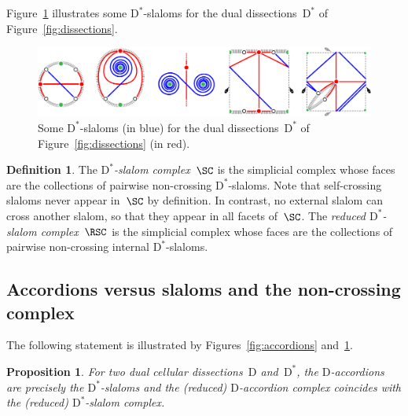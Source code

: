 \documentclass{amsart}
\newtheorem{proposition}[theorem]{Proposition}
\theoremstyle{definition}
\newtheorem{definition}[theorem]{Definition}
\newtheorem{remark}[theorem]{Remark}
\newcommand{\fref}[1]{Figure~\ref{#1}} %
\newcommand{\darkblue}{\color{darkblue}} %
\newcommand{\defn}[1]{\textsl{\darkblue #1}} %
\newcommand{\dual}{^*} %
\newcommand{\dissection}{\mathrm{D}} %
\begin{document}
\fref{fig:slaloms} illustrates some $\dissection\dual$-slaloms for the dual dissections~$\dissection\dual$ of \fref{fig:dissections}.

\begin{figure}[t]
	\capstart
	\centerline{\includegraphics[scale=.7]{slaloms}}
	\caption{Some $\dissection\dual$-slaloms (in blue) for the dual dissections~$\dissection\dual$ of \fref{fig:dissections} (in red).}
	\label{fig:slaloms}
\end{figure}

\begin{definition}
\label{def:slalomComplex}
The \defn{$\dissection\dual$-slalom complex}~$\SC$ is the simplicial complex whose faces are the collections of pairwise non-crossing $\dissection\dual$-slaloms.
Note that self-crossing slaloms never appear in~$\SC$ by definition.
In contrast, no external slalom can cross another slalom, so that they appear in all facets of~$\SC$. 
The \defn{reduced $\dissection\dual$-slalom complex}~$\RSC$ is the simplicial complex whose faces are the collections of pairwise non-crossing internal $\dissection\dual$-slaloms.
\end{definition}


\subsection{Accordions versus slaloms and the non-crossing complex}
\label{subsec:accordionsVSSlaloms}

The following statement is illustrated by Figures~\ref{fig:accordions} and~\ref{fig:slaloms}.

\begin{proposition}
\label{prop:accordionsSlaloms}
For two dual cellular dissections~$\dissection$ and~$\dissection\dual$, the $\dissection$-accordions are precisely the $\dissection\dual$-slaloms and the (reduced) $\dissection$-accordion complex coincides with the (reduced) $\dissection\dual$-slalom complex.
\end{proposition}
\end{document}
